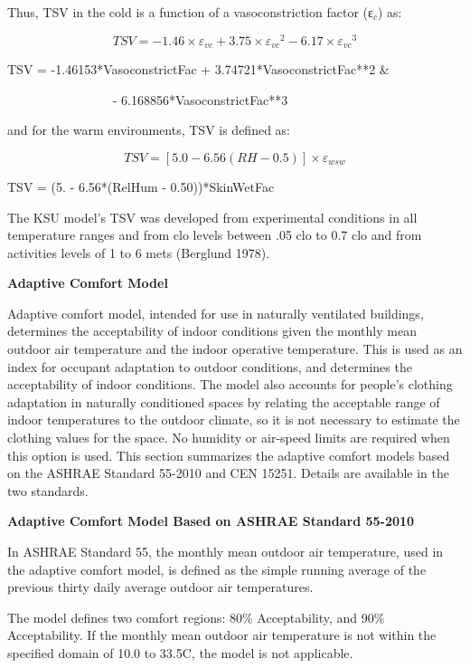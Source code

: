 Thus, TSV in the cold is a function of a vasoconstriction factor (ε\(_{c}\)) as:

\begin{equation}
TSV =  - 1.46 \times {\varepsilon_{vc}} + 3.75 \times {\varepsilon_{vc}}^2 - 6.17 \times {\varepsilon_{vc}}^3
\end{equation}

TSV = -1.46153*VasoconstrictFac + 3.74721*VasoconstrictFac**2 \&

~~~~~~~~~~~~~~~~ - 6.168856*VasoconstrictFac**3

and for the warm environments, TSV is defined as:

\begin{equation}
TSV = [5.0 - 6.56(RH - 0.5)] \times {\varepsilon_{wsw}}
\end{equation}

TSV = (5. - 6.56*(RelHum - 0.50))*SkinWetFac

The KSU model's TSV was developed from experimental conditions in all temperature ranges and from clo levels between .05 clo to 0.7 clo and from activities levels of 1 to 6 mets (Berglund 1978).

\textbf{Adaptive Comfort Model}

Adaptive comfort model, intended for use in naturally ventilated buildings, determines the acceptability of indoor conditions given the monthly mean outdoor air temperature and the indoor operative temperature. This is used as an index for occupant adaptation to outdoor conditions, and determines the acceptability of indoor conditions. The model also accounts for people's clothing adaptation in naturally conditioned spaces by relating the acceptable range of indoor temperatures to the outdoor climate, so it is not necessary to estimate the clothing values for the space. No humidity or air-speed limits are required when this option is used. This section summarizes the adaptive comfort models based on the ASHRAE Standard 55-2010 and CEN 15251. Details are available in the two standards.

\textbf{Adaptive Comfort Model Based on ASHRAE Standard 55-2010}

In ASHRAE Standard 55, the monthly mean outdoor air temperature, used in the adaptive comfort model, is defined as the simple running average of the previous thirty daily average outdoor air temperatures.

The model defines two comfort regions: 80\% Acceptability, and 90\% Acceptability. If the monthly mean outdoor air temperature is not within the specified domain of 10.0 to 33.5C, the model is not applicable.

